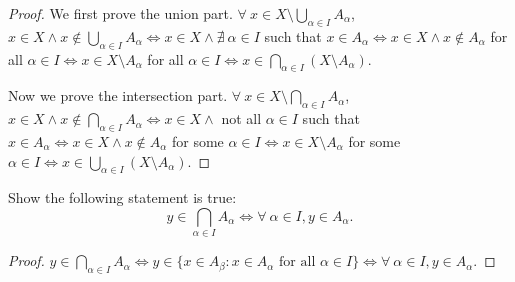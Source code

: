 \begin{proof}
We first prove the union part.
\(\forall\ x \in X \setminus \bigcup_{\alpha \in I} A_{\alpha}\), \(x \in X \land x \notin \bigcup_{\alpha \in I} A_{\alpha} \iff x \in X \land \nexists\ \alpha \in I\) such that \(x \in A_{\alpha} \iff x \in X \land x \notin A_{\alpha}\) for all \(\alpha \in I \iff x \in X \setminus A_{\alpha}\) for all \(\alpha \in I \iff x \in \bigcap_{\alpha \in I} (X \setminus A_{\alpha})\).

Now we prove the intersection part.
\(\forall\ x \in X \setminus \bigcap_{\alpha \in I} A_{\alpha}\), \(x \in X \land x \notin \bigcap_{\alpha \in I} A_{\alpha} \iff x \in X \land\) not all \(\alpha \in I\) such that \(x \in A_{\alpha} \iff x \in X \land x \notin A_{\alpha}\) for some \(\alpha \in I \iff x \in X \setminus A_{\alpha}\) for some \(\alpha \in I \iff x \in \bigcup_{\alpha \in I} (X \setminus A_{\alpha})\).
\end{proof}

\begin{exercise}\label{ex 3.4.12}
Show the following statement is true:
\[
    y \in \bigcap_{\alpha \in I} A_{\alpha} \iff \forall\ \alpha \in I, y \in A_{\alpha}.
\]
\end{exercise}

\begin{proof}
\(y \in \bigcap_{\alpha \in I} A_{\alpha} \iff y \in \{x \in A_{\beta} : x \in A_{\alpha} \text{ for all } \alpha \in I\} \iff \forall\ \alpha \in I, y \in A_{\alpha}\).
\end{proof}